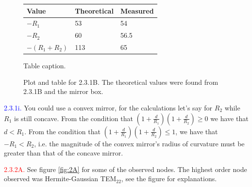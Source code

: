 \documentclass[letterpaper, reqno,11pt]{article}
\begin{document}
\begin{figure}[htpb]
    \centering
    \begin{minipage}[b]{0.45\textwidth}
    \begin{tabular}{|l|l|l|}
    \hline
    Value & Theoretical & Measured \\
    \hline
    $-R_1$ & 53 & 54 \\
    $-R_2$ & 60 & 56.5 \\
    $-(R_1+R_2)$ & 113 & 65 \\
    \hline
    \end{tabular}
    \caption{Table caption.}
    \label{fig:table1}
    \end{minipage}
    \hfill
    \caption{Plot and table for 2.3.1B. The theoretical values were found from 2.3.1B and the mirror box.}
    \label{fig:1A}
\end{figure}

\noindent \textcolor{blue}{2.3.1i.} You could use a convex mirror, for the calculations let's say for $R_2$ while $R_1$ is still concave. From the condition that $\left(1+ \frac{d}{R_1}\right) \left( 1+ \frac{d}{R_2} \right)\geq 0$ we have that $d<R_1$. From the condition that $\left(1+ \frac{d}{R_1}\right) \left( 1+ \frac{d}{R_2} \right)\leq 1$, we have that $-R_1<R_2$, i.e. the magnitude of the convex mirror's radius of curvature must be greater than that of the concave mirror.

\noindent \textcolor{red}{2.3.2A.} See figure \ref{fig:2A} for some of the observed nodes. The highest order node observed was Hermite-Gaussian TEM$_{22}$, see the figure for explanations.
\end{document}
